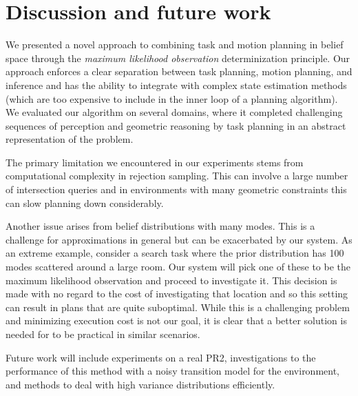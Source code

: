 \section{Discussion and future work}
We presented a novel approach to combining task and motion planning in
belief space through the \emph{maximum likelihood observation}
determinization principle. Our approach enforces a clear separation
between task planning, motion planning, and inference and has the
ability to integrate with complex state estimation methods (which are
too expensive to include in the inner loop of a planning
algorithm). We evaluated our algorithm on several domains, where it
completed challenging sequences of perception and geometric reasoning
by task planning in an abstract representation of the problem.

The primary limitation we encountered in our experiments stems from
computational complexity in rejection sampling. This can involve a
large number of intersection queries and in environments with many
geometric constraints this can slow planning down considerably.

Another issue arises from belief distributions with many modes. This
is a challenge for \mld{} approximations in general but can be
exacerbated by our system. As an extreme example, consider a search
task where the prior distribution has 100 modes scattered around a
large room. Our system will pick one of these to be the maximum
likelihood observation and proceed to investigate it. This decision is
made with no regard to the cost of investigating that location and so
this setting can result in plans that are quite suboptimal. While this
is a challenging problem and minimizing execution cost is not our
goal, it is clear that a better solution is needed for \ibsp{} to be
practical in similar scenarios.

Future work will include experiments on a real PR2, investigations to
the performance of this method with a noisy transition model for the
environment, and methods to deal with high variance distributions
efficiently.
